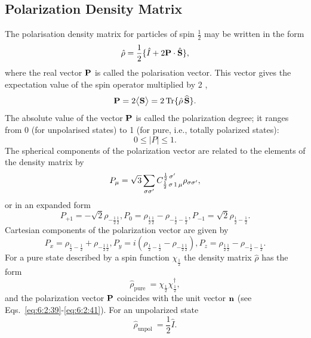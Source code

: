 \subsection{Polarization Density Matrix}\label{sec:6.2.7}
The polarisation density matrix for particles of spin $\frac{1}{2}$ may be written in the form
\begin{equation}
\hat{\rho}=\frac{1}{2}\{\hat{I}+2 \mathbf{P}\cdot \hat{\mathbf{S}}\}, \label{eq:6:2:47}
\end{equation}
where the real vector $\mathbf{P}$ is called the polarisation vector. This vector gives the expectation value of the spin operator multiplied by 2 ,
\begin{equation}
\mathbf{P}=2\bigl\langle \mathbf{S} \bigr\rangle=2 \operatorname{Tr} \{\hat{\rho}\, \widehat{\mathbf{S}}\} . \label{eq:6:2:48}
\end{equation}
The absolute value of the vector $\mathbf{P}$ is called the polarization degree; it ranges from 0 (for unpolarised states) to 1 (for pure, i.e., totally polarized states):
\begin{equation}
0 \leq|P| \leq 1 . \label{eq:6:2:49}
\end{equation}
The spherical components of the polarization vector are related to the elements of the density matrix by
\begin{equation}
P_{\mu}=\sqrt{3} \sum_{\sigma \sigma^{\prime}} C_{\frac{1}{2}\,\sigma\,1\,\mu}^{\frac{1}{2}\,\sigma^{\prime}} \rho_{\sigma \sigma^{\prime}}, \label{eq:6:2:50}
\end{equation}
or in an expanded form
\begin{equation}
P_{+1}=-\sqrt{2} \rho_{-\frac{1}{2} \frac{1}{2}}, P_{0}=\rho_{\frac{1}{2} \frac{1}{2}}-\rho_{-\frac{1}{2}-\frac{1}{2}}, P_{-1}=\sqrt{2} \rho_{\frac{1}{2}-\frac{1}{2}} . \label{eq:6:2:51}
\end{equation}
Cartesian components of the polarization vector are given by
\begin{equation}
P_{x}=\rho_{\frac{1}{2}-\frac{1}{2}}+\rho_{-\frac{1}{2} \frac{1}{2}}, P_{y}=i\left(\rho_{\frac{1}{2}-\frac{1}{2}}-\rho_{-\frac{1}{2} \frac{1}{2}}\right), P_{z}=\rho_{\frac{1}{2} \frac{1}{2}}-\rho_{-\frac{1}{2}-\frac{1}{2}} . \label{eq:6:2:52}
\end{equation}
For a pure state described by a spin function $\chi_{\frac{1}{2}}$ the density matrix $\hat{\rho}$ has the form
\begin{equation}
\hat{\rho}_{\text {pure }}=\chi_{\frac{1}{2}} \chi_{\frac{1}{2}}^{\dagger}, \label{eq:6:2:53}
\end{equation}
and the polarization vector $\mathbf{P}$ coincides with the unit vector $\mathbf{n}$ (see Eqs.~\eqref{eq:6:2:39}-\eqref{eq:6:2:41}). For an unpolarized state
\begin{equation}
\hat{\rho}_{\text {unpol }}=\frac{1}{2} \widehat{I} . \label{eq:6:2:54}
\end{equation}
